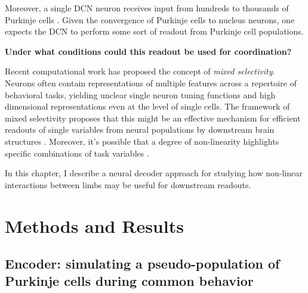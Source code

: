 Moreover, a single DCN neuron receives input from hundreds to thousands of Purkinje cells \cite{personSynchronyNeuralCoding2012}. Given the convergence of Purkinje cells to nucleus neurons, one expects the DCN to perform some sort of readout from Purkinje cell populations. 

\textbf{Under what conditions could this readout be used for coordination?}

Recent computational work has proposed the concept of \textit{mixed selectivity}. Neurons often contain representations of multiple features across a repertoire of behavioral tasks, yielding unclear single neuron tuning functions and high dimensional representations even at the level of single cells. The framework of mixed selectivity proposes that this might be an effective mechanism for efficient readouts of single variables from neural populations by downstream brain structures \cite{rigottiImportanceMixedSelectivity2013}. 
Moreover, it's possible that a degree of non-linearity highlights specific combinations of task variables \cite{johnstonNonlinearMixedSelectivity2020}.

In this chapter, I describe a neural decoder approach for studying how non-linear interactions between limbs may be useful for downstream readouts.






\section{Methods and Results}
\subsection{Encoder: simulating a pseudo-population of Purkinje cells during common behavior}

